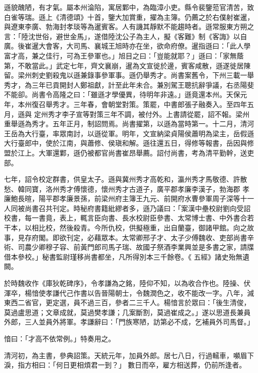 \begin{pinyinscope}
 遜貌醜陋，有才氣。屬本州淪陷，寓居鄴中，為臨漳小吏。縣令裴鑒蒞官清苦，致白雀等瑞。遜上《清德頌》十首，鑒大加賞重，擢為主簿。仍薦之於右僕射崔暹，與遼東李廣、勃海封孝琰等為暹賓客。人有譏其靜默不能趨時者。遜常服東方朔之言：「陸沈世俗，避世金馬」，遂借陸沈公子為主人，擬《客難》制《客誨》以自
 廣。後崔暹大會客，大司馬、襄城王旭時亦在坐，欲命府僚。暹指遜曰：「此人學富才高，兼之佳行，可為王參軍也。」旭目之曰：「豈能就耶？」遜曰：「家無蔭第，不敢當此。」武定七年，齊文襄崩，暹為文宣徙於邊，賓客咸散，遜遂徙居陳留。梁州刺史劉殺鬼以遜兼錄事參軍事。遜仍舉秀才。尚書案舊令，下州三載一舉秀才，為三年已貢開封人鄭祖獻，計至此年未合。兼別駕王聰抗辭爭議，右丞陽斐不能卻。尚書令高隆之曰：「雖遜才學優異，待明年非遠。」遜竟還本州。天保元年，本州復召舉秀才。三年春，會朝堂對策。策罷，中書郎張子融奏入。至四年五月，遜與
 定州秀才李子宣等對策三年不調，被付外。上書請從罷，詔不報。梁州重舉遜為秀才。五年正月，制詔問焉。尚書擢第，以遜為當時第一。十二月，清河王岳為大行臺，率眾南討，以遜從軍。明年，文宣納梁貞陽侯蕭明為梁主，岳假遜大行臺郎中，使於江南，與蕭修、侯瑱和解。遜往還五日，得修等報書，岳因與修盟於江上。大軍還鄴，遜仍被都官尚書崔昂舉薦。詔付尚書，考為清平勤幹，送吏部。



 七年，詔令校定群書，供皇太子。遜與冀州秀才高乾和，瀛州秀才馬敬德、許散愁、韓同寶，洛州秀才傅懷德，懷州秀才古道子，廣平郡孝廉李漢子，勃海郡
 孝廉鮑長暄，陽平郡孝廉景孫，前梁州府主簿王九元、前開府水曹參軍周子深等十一人同被尚書召共刊定。時秘府書籍紕繆者多，遜乃議曰：「案漢中壘校尉劉向受詔校書，每一書竟，表上，輒言臣向書、長水校尉臣參書、太常博士書、中外書合若干本，以相比校，然後殺青。今所仇校，供擬極重，出自蘭臺，御諸甲館。向之故事，見存府閣。即欲刊定，必藉眾本。太常卿邢子才、太子少傅魏收、吏部尚書辛術、司農少卿穆子容、前黃門郎司馬子瑞、故國子祭酒李業興並是多書之家，請牒借本參校。」秘書監尉瑾移尚書都坐，凡所得別本三千餘卷。《
 五經》諸史殆無遺闕。



 於時魏收作《庫狄乾碑序》，令孝謙為之銘，陸仰不知，以為收合作也。陸操、伏渾卒，楊愔使孝謙代己作書以告晉陽朝士，令魏潤色之，收不能改一字。八年，減東西二省官，更定選，員不過三百，參者二三千人。楊愔言於眾曰：「後生清俊，莫過盧思道；文章成就，莫過樊孝謙；几案斷割，莫過崔成之。」遂以思道長兼員外郎，三人並員外將軍。孝謙辭曰：「門族寒陋，訪第必不成，乞補員外司馬督。」



 愔曰：「才高不依常例。」特奏用之。



 清河初，為主書，參典詔策。天統元年，加員外郎。居七八日，行過轜車，嚬眉下淚，指方相曰：「何日更相煩君一到？」
 數日而卒，雇方相送葬，仍前所逢者。




\end{pinyinscope}

